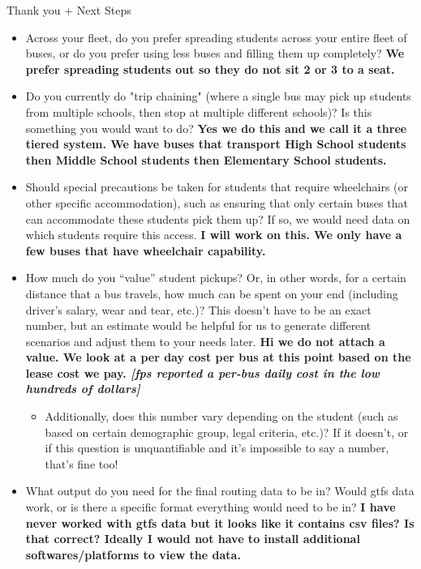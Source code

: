 {\begin{emailbox}{Thank you + Next Steps}
    \begin{itemize}
        \item Across your fleet, do you prefer spreading students across your entire fleet of buses, or do you prefer using less buses and filling them up completely? \textbf{We prefer spreading students out so they do not sit 2 or 3 to a seat.}
        \item Do you currently do "trip chaining" (where a single bus may pick up students from multiple schools, then stop at multiple different schools)? Is this something you would want to do? \textbf{Yes we do this and we call it a three tiered system. We have buses that transport High School students then Middle School students then Elementary School students.}
        \item Should special precautions be taken for students that require wheelchairs (or other specific accommodation), such as ensuring that only certain buses that can accommodate these students pick them up? If so, we would need data on which students require this access. \textbf{I will work on this. We only have a few buses that have wheelchair capability.}
        \item How much do you ``value'' student pickups? Or, in other words, for a certain distance that a bus travels, how much can be spent on your end (including driver's salary, wear and tear, etc.)? This doesn't have to be an exact number, but an estimate would be helpful for us to generate different scenarios and adjust them to your needs later. \textbf{Hi we do not attach a value. We look at a per day cost per bus at this point based on the lease cost we pay. \textit{[\gls{fps} reported a per-bus daily cost in the low hundreds of dollars]}}
        \begin{itemize}
            \item Additionally, does this number vary depending on the student (such as based on certain demographic group, legal criteria, etc.)? If it doesn't, or if this question is unquantifiable and it's impossible to say a number, that's fine too!
        \end{itemize}
        \item What output do you need for the final routing data to be in? Would \acrshort{gtfs} data work, or is there a specific format everything would need to be in? \textbf{I have never worked with \acrshort{gtfs} data but it looks like it contains \acrshort{csv} files? Is that correct? Ideally I would not have to install additional softwares/platforms to view the data.}
    \end{itemize}


\end{emailbox}}

